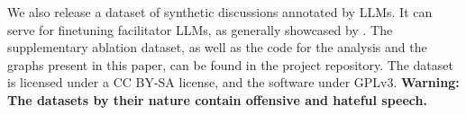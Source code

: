 %

We also release \vmd\datasetlink a dataset of synthetic discussions annotated by LLMs. It can serve for finetuning facilitator LLMs, as generally showcased by \citet{ulmer2024}. The supplementary ablation dataset, as well as the code for the analysis and the graphs present in this paper, can be found in the project repository\analysislink. The dataset is licensed under a CC BY-SA license, and the software under GPLv3. \textbf{Warning: The datasets by their nature contain offensive and hateful speech.}